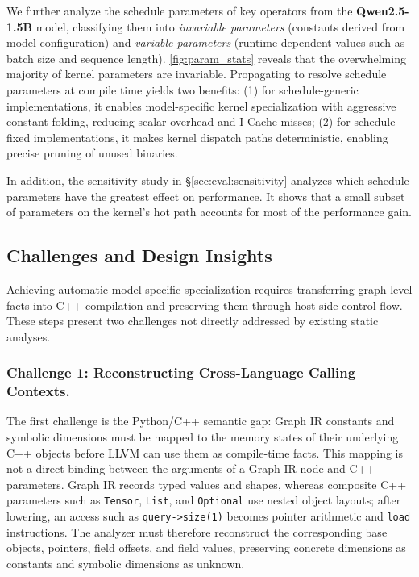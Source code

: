We further analyze the schedule parameters of key operators from the \textbf{Qwen2.5-1.5B} model, classifying them into \textit{invariable parameters} (constants derived from model configuration) and \textit{variable parameters} (runtime-dependent values such as batch size and sequence length).
\autoref{fig:param_stats} reveals that the overwhelming majority of kernel parameters are invariable.
Propagating \initialconsts to resolve schedule parameters at compile time yields two benefits: (1) for schedule-generic implementations, it enables model-specific kernel specialization with aggressive constant folding, reducing scalar overhead and I-Cache misses; (2) for schedule-fixed implementations, it makes kernel dispatch paths deterministic, enabling precise pruning of unused binaries.

In addition, the sensitivity study in \S\ref{sec:eval:sensitivity} analyzes which schedule parameters have the greatest effect on performance.
It shows that a small subset of parameters on the kernel's hot path accounts for most of the performance gain.

\subsection{Challenges and Design Insights}
\label{sec:motivation:challenges}

Achieving automatic model-specific specialization requires transferring graph-level facts into C++ compilation and preserving them through host-side control flow.
These steps present two challenges not directly addressed by existing static analyses.

\subsubsection{Challenge 1: Reconstructing Cross-Language Calling Contexts.}

The first challenge is the Python/C++ semantic gap: Graph IR constants and symbolic dimensions must be mapped to the memory states of their underlying C++ objects before LLVM can use them as compile-time facts.
This mapping is not a direct binding between the arguments of a Graph IR node and C++ parameters.
Graph IR records typed values and shapes, whereas composite C++ parameters such as \texttt{Tensor}, \texttt{List}, and \texttt{Optional} use nested object layouts; after lowering, an access such as \texttt{query->size(1)} becomes pointer arithmetic and \texttt{load} instructions.
The analyzer must therefore reconstruct the corresponding base objects, pointers, field offsets, and field values, preserving concrete dimensions as constants and symbolic dimensions as unknown.

